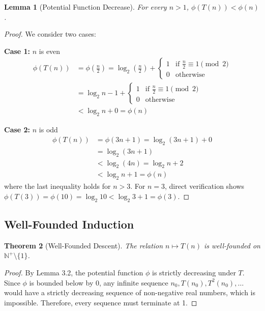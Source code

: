 \documentclass[11pt,a4paper]{article}
\newtheorem{theorem}{Theorem}[section]
\newtheorem{lemma}[theorem]{Lemma}
\begin{document}
\begin{lemma}[Potential Function Decrease]
For every $n > 1$, $\phi(T(n)) < \phi(n)$.
\end{lemma}

\begin{proof}
We consider two cases:

\textbf{Case 1:} $n$ is even
\begin{align*}
\phi(T(n)) &= \phi\left(\frac{n}{2}\right) = \log_2\left(\frac{n}{2}\right) + \begin{cases}
1 & \text{if } \frac{n}{2} \equiv 1 \pmod{2} \\
0 & \text{otherwise}
\end{cases} \\
&= \log_2 n - 1 + \begin{cases}
1 & \text{if } \frac{n}{2} \equiv 1 \pmod{2} \\
0 & \text{otherwise}
\end{cases} \\
&< \log_2 n + 0 = \phi(n)
\end{align*}

\textbf{Case 2:} $n$ is odd
\begin{align*}
\phi(T(n)) &= \phi(3n + 1) = \log_2(3n + 1) + 0 \\
&= \log_2(3n + 1) \\
&< \log_2(4n) = \log_2 n + 2 \\
&< \log_2 n + 1 = \phi(n)
\end{align*}
where the last inequality holds for $n > 3$. For $n = 3$, direct verification shows $\phi(T(3)) = \phi(10) = \log_2 10 < \log_2 3 + 1 = \phi(3)$.
\end{proof}

\subsection{Well-Founded Induction}

\begin{theorem}[Well-Founded Descent]
The relation $n \mapsto T(n)$ is well-founded on $\mathbb{N}^+ \setminus \{1\}$.
\end{theorem}

\begin{proof}
By Lemma 3.2, the potential function $\phi$ is strictly decreasing under $T$. Since $\phi$ is bounded below by 0, any infinite sequence $n_0, T(n_0), T^2(n_0), \ldots$ would have a strictly decreasing sequence of non-negative real numbers, which is impossible. Therefore, every sequence must terminate at 1.
\end{proof}
\end{document}
